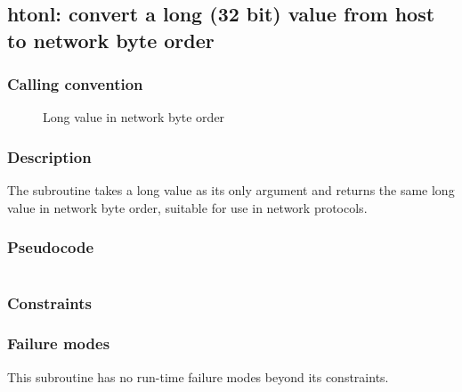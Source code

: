 \clearpage
{}
{}
\label{subr:htonl}
\subsection*{htonl: convert  a  long (32 bit)  value from host to network byte order}

\subsubsection*{Calling convention}

\begin{description}
\item[] Long value in network byte order
\end{description}

\subsubsection*{Description}

The  subroutine takes a long value as its only
argument and returns the same long value in network byte order,
suitable for use in network protocols.

\subsubsection*{Pseudocode}

\begin{verbatim}
\end{verbatim}

\subsubsection*{Constraints}

\subsubsection*{Failure modes}

This subroutine has no run-time failure modes beyond its constraints.
